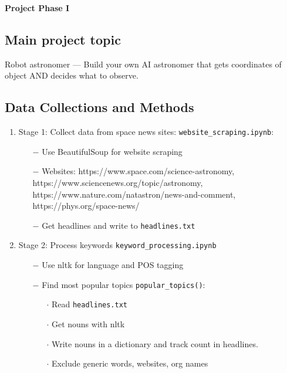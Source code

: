 \documentclass[12pt,letterpaper]{article}
\begin{document}
  \thispagestyle{firstpagestyle}
  \begin{center}
    {\huge \textbf{Project Phase I}}
  \end{center}

    
\subsection*{Main project topic}
Robot astronomer — Build your own AI astronomer that gets 
coordinates of object AND decides what to observe.


\subsection*{Data Collections and Methods}
\begin{enumerate}[leftmargin=*]
    \item Stage 1: Collect data from space news sites:  \texttt{website\_scraping.ipynb}:
        \begin{enumerate}
            \item [$-$] Use BeautifulSoup for website scraping
            \item [$-$] Websites: https://www.space.com/science-astronomy, \\
            https://www.sciencenews.org/topic/astronomy, \\ 
            https://www.nature.com/natastron/news-and-comment, \\ 
            https://phys.org/space-news/
            \item [$-$] Get headlines and write to \texttt{headlines.txt}
        \end{enumerate}
    \item Stage 2: Process keywords \texttt{keyword\_processing.ipynb}
        \begin{enumerate}
            \item [$-$] Use nltk for language and POS tagging
            \item [$-$] Find most popular topics \texttt{popular\_topics()}:
            \begin{enumerate}[leftmargin=*]
                \item[$\cdot$] Read \texttt{headlines.txt}
                \item[$\cdot$]Get nouns with nltk
                \item[$\cdot$]Write nouns in a dictionary and track count in headlines.
                \item[$\cdot$]Exclude generic words, websites, org names

\end{enumerate}
\end{enumerate}
\end{enumerate}
\end{document}
